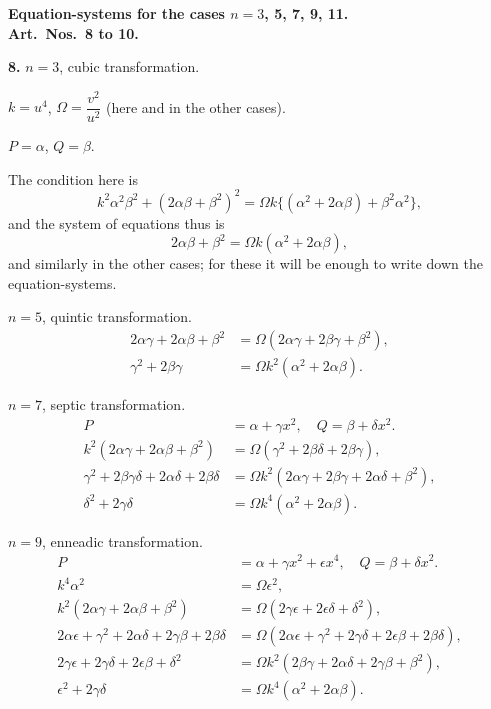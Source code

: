 \documentclass[11pt,a4paper]{book}
\begin{document}
\medskip
\noindent\textbf{Equation-systems for the cases $n = 3$, 5, 7, 9, 11.}\\
\textbf{Art.~Nos.~8 to 10.}

\medskip
\noindent\textbf{8.} $n = 3$, cubic transformation.

$k = u^4$, $\Omega = \dfrac{v^2}{u^2}$ (here and in the other cases).

$P = \alpha$, $Q = \beta$.

The condition here is
\[
k^2\alpha^2\beta^2 + (2\alpha\beta + \beta^2)^2 = \Omega k\{(\alpha^2 + 2\alpha\beta) + \beta^2\alpha^2\},
\]
and the system of equations thus is
\[
2\alpha\beta + \beta^2 = \Omega k(\alpha^2 + 2\alpha\beta),
\]
and similarly in the other cases; for these it will be enough to write down the equation-systems.

$n = 5$, quintic transformation.
\begin{align*}
2\alpha\gamma + 2\alpha\beta + \beta^2 &= \Omega(2\alpha\gamma + 2\beta\gamma + \beta^2), \\
\gamma^2 + 2\beta\gamma &= \Omega k^2(\alpha^2 + 2\alpha\beta).
\end{align*}

$n = 7$, septic transformation.
\begin{align*}
P &= \alpha + \gamma x^2, \quad Q = \beta + \delta x^2. \\
k^2(2\alpha\gamma + 2\alpha\beta + \beta^2) &= \Omega(\gamma^2 + 2\beta\delta + 2\beta\gamma), \\
\gamma^2 + 2\beta\gamma\delta + 2\alpha\delta + 2\beta\delta &= \Omega k^2(2\alpha\gamma + 2\beta\gamma + 2\alpha\delta + \beta^2), \\
\delta^2 + 2\gamma\delta &= \Omega k^4(\alpha^2 + 2\alpha\beta).
\end{align*}

$n = 9$, enneadic transformation.
\begin{align*}
P &= \alpha + \gamma x^2 + \epsilon x^4, \quad Q = \beta + \delta x^2. \\
k^4\alpha^2 &= \Omega\epsilon^2, \\
k^2(2\alpha\gamma + 2\alpha\beta + \beta^2) &= \Omega(2\gamma\epsilon + 2\epsilon\delta + \delta^2), \\
2\alpha\epsilon + \gamma^2 + 2\alpha\delta + 2\gamma\beta + 2\beta\delta &= \Omega(2\alpha\epsilon + \gamma^2 + 2\gamma\delta + 2\epsilon\beta + 2\beta\delta), \\
2\gamma\epsilon + 2\gamma\delta + 2\epsilon\beta + \delta^2 &= \Omega k^2(2\beta\gamma + 2\alpha\delta + 2\gamma\beta + \beta^2), \\
\epsilon^2 + 2\gamma\delta &= \Omega k^4(\alpha^2 + 2\alpha\beta).
\end{align*}
\end{document}
